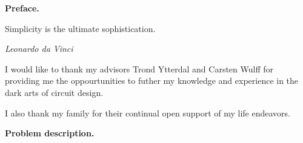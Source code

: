 	\pagebreak
	\thispagestyle{nohdr}
	\null\pagebreak
	\thispagestyle{nohdr}
	\large\fontfamily{\sfdefault}\selectfont 
	\Huge\textbf{Preface.}\\
	\epigraph{Simplicity is the ultimate sophistication.}{\textit{Leonardo da Vinci}}
	\large\fontfamily{\rmdefault}\selectfont 
	\vspace{1em}
	I would like to thank my advisors Trond Ytterdal and Carsten Wulff for providing me the oppourtunities to futher my knowledge and experience in the dark arts of circuit design.

	\par I also thank my family for their continual open support of my life endeavors.




	\pagebreak
	\thispagestyle{nohdr}
	\null\pagebreak
	\thispagestyle{nohdr}
	\large\fontfamily{\sfdefault}\selectfont 
	\Huge\textbf{Problem description.}\\
	\large\fontfamily{\rmdefault}\selectfont 
	
